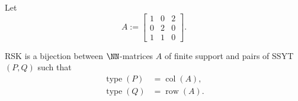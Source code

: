 \documentclass{article}
\DeclareMathOperator{\row}{row}
\DeclareMathOperator{\col}{col}
\DeclareMathOperator{\type}{type}
\begin{document}
\begin{example}
    Let 
    \[
        A := \begin{bmatrix}
            1 & 0 & 2 \\
            0 & 2 & 0 \\
            1 & 1 & 0
        \end{bmatrix}.
    \]
\end{example}

\begin{theorem}
    RSK is a bijection between $\NN$-matrices $A$ of finite support and pairs of SSYT $(P,Q)$ such that
    \begin{align*}
        \type(P) &= \col(A), \\
        \type(Q) &= \row(A).
    \end{align*}
\end{theorem}
\end{document}
